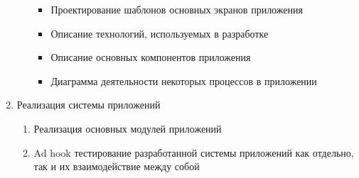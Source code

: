 \begin{enumerate}
\begin{enumerate}
\begin{itemize}
            \item Проектирование шаблонов основных экранов приложения
            \item Описание технологий, используемых в разработке
            \item Описание основных компонентов приложения
            \item Диаграмма деятельности некоторых процессов в приложении
        \end{itemize}
    \end{enumerate}
    \item Реализация системы приложений
    \begin{enumerate}
        \item Реализация основных модулей приложений
        \item Ad hook тестирование разработанной системы приложений как отдельно, так и их взаимодействие между собой
    \end{enumerate}
\end{enumerate}